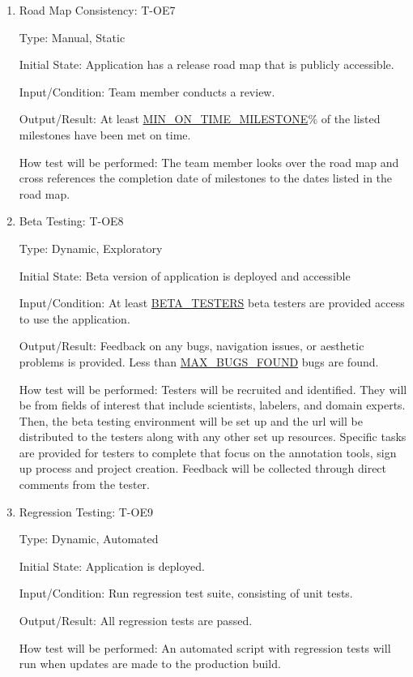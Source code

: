 \documentclass[12pt, titlepage]{article}
\begin{document}
\begin{enumerate}

\item{Road Map Consistency: T-OE7\\}

Type: Manual, Static
					
Initial State: Application has a release road map that is publicly accessible.
					
Input/Condition: Team member conducts a review.
					
Output/Result: At least \hyperref[MIN_ON_TIME_MILESTONE]{MIN\_ON\_TIME\_MILESTONE}\% of the listed milestones have been met on time.
					
How test will be performed: The team member looks over the road map and cross references the completion date of milestones to the dates listed in the road map.

\item{Beta Testing: T-OE8\\}

Type: Dynamic, Exploratory
					
Initial State: Beta version of application is deployed and accessible
					
Input/Condition: At least \hyperref[BETA_TESTERS]{BETA\_TESTERS} beta testers are provided access to use the application.
					
Output/Result: Feedback on any bugs, navigation issues, or aesthetic problems is provided. Less than \hyperref[MAX_BUGS_FOUND]{MAX\_BUGS\_FOUND} bugs are found.
					
How test will be performed: Testers will be recruited and identified. They will be from fields of interest that include scientists, labelers, and domain experts. Then, the beta testing environment will be set up and the url will be distributed to the testers along with any other set up resources. Specific tasks are provided for testers to complete that focus on the annotation tools, sign up process and project creation. Feedback will be collected through direct comments from the tester.

\item{Regression Testing: T-OE9\\}

Type: Dynamic, Automated
					
Initial State: Application is deployed.
					
Input/Condition: Run regression test suite, consisting of unit tests.
					
Output/Result: All regression tests are passed.
					
How test will be performed: An automated script with regression tests will run when updates are made to the production build.

\end{enumerate}
\end{document}
